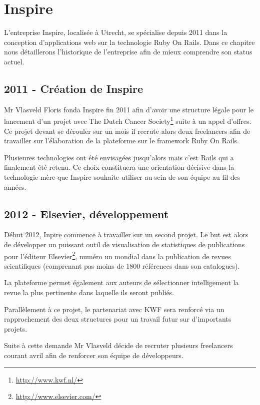 \documentclass[12pt,a4paper]{book}
\begin{document}
\chapter{Inspire}

L'entreprise Inspire, localisée à Utrecht, se spécialise depuis 2011 dans la conception d'applications web sur la technologie Ruby On Rails. Dans ce chapitre nous détaillerons l'historique de l'entreprise afin de mieux comprendre son status actuel.

\section{2011 - Création de Inspire}

Mr Vlasveld Floris fonda Inspire fin 2011 afin d'avoir une structure légale pour le lancement d'un projet avec The Dutch Cancer Society\footnote{\url{http://www.kwf.nl/}} suite à un appel d'offres. Ce projet devant se dérouler sur un mois il recrute alors deux freelancers afin de travailler sur l'élaboration de la plateforme sur le framework Ruby On Rails.

Plusieures technologies ont été envisagées jusqu'alors mais c'est Rails qui a finalement été retenu. Ce choix constituera une orientation décisive dans la technologie mère que Inspire souhaite utiliser au sein de son équipe au fil des années.

\section{2012 - Elsevier, développement}

Début 2012, Inpire commence à travailler sur un second projet. Le but est alors de développer un puissant outil de visualisation de statistiques de publications pour l'éditeur Elsevier\footnote{\url{http://www.elsevier.com/}}, numéro un mondial dans la publication de revues scientifiques (comprenant pas moins de 1800 références dans son catalogues).

La plateforme permet également aux auteurs de sélectionner intelligement la revue la plus pertinente dans laquelle ils seront publiés.

Parallèlement à ce projet, le partenariat avec KWF sera renforcé via un rapprochement des deux structures pour un travail futur sur d'importants projets.

Suite à cette demande Mr Vlasveld décide de recruter plusieurs freelancers courant avril afin de renforcer son équipe de développeurs.
\end{document}
